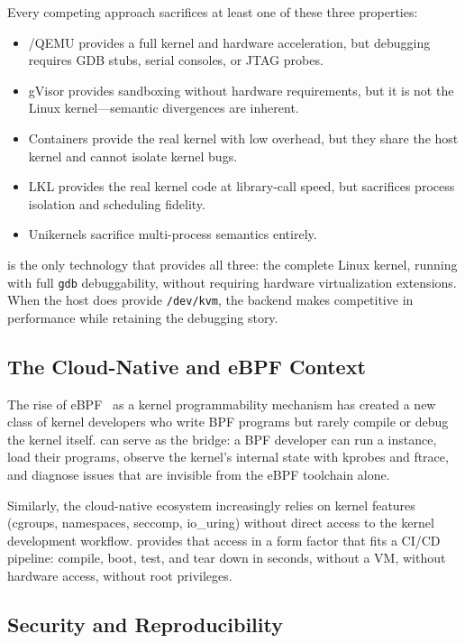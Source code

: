 Every competing approach sacrifices at least one of these three
properties:

\begin{itemize}[leftmargin=2em]
  \item \KVM{}/QEMU provides a full kernel and hardware acceleration,
    but debugging requires GDB stubs, serial consoles, or JTAG
    probes.
  \item gVisor provides sandboxing without hardware requirements, but
    it is not the Linux kernel---semantic divergences are inherent.
  \item Containers provide the real kernel with low overhead, but they
    share the host kernel and cannot isolate kernel bugs.
  \item \textsc{LKL} provides the real kernel code at library-call
    speed, but sacrifices process isolation and scheduling fidelity.
  \item Unikernels sacrifice multi-process semantics entirely.
\end{itemize}

\noindent
\UML{} is the only technology that provides all three: the complete
Linux kernel, running with full \texttt{gdb} debuggability, without
requiring hardware virtualization extensions.  When the host does
provide \texttt{/dev/kvm}, the \KVMvTwo{} backend makes \UML{}
competitive in performance while retaining the debugging story.

\subsection{The Cloud-Native and eBPF Context}

The rise of eBPF~\cite{ebpf} as a kernel programmability mechanism
has created a new class of kernel developers who write BPF programs
but rarely compile or debug the kernel itself.  \UML{} can serve as
the bridge: a BPF developer can run a \UML{} instance, load their
programs, observe the kernel's internal state with kprobes and
ftrace, and diagnose issues that are invisible from the eBPF
toolchain alone.

Similarly, the cloud-native ecosystem increasingly relies on kernel
features (cgroups, namespaces, seccomp, io\_uring) without direct
access to the kernel development workflow.  \UML{} provides that
access in a form factor that fits a CI/CD pipeline: compile, boot,
test, and tear down in seconds, without a VM, without hardware
access, without root privileges.

\subsection{Security and Reproducibility}

